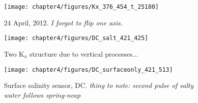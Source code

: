 \begin{figure}
	\texttt{[image: chapter4/figures/Kx\_376\_454\_t\_25180]} 
\caption{24 April, 2012. \emph{I forgot to flip one axis.}} \label{fig:Kx424}
\end{figure}



\begin{figure}
	\texttt{[image: chapter4/figures/DC\_salt\_421\_425]}
	\caption{Two K$_x$ structure due to vertical processes...} \label{fig:SDCApr2012}
\end{figure}


\begin{figure}
	\texttt{[image: chapter4/figures/DC\_surfaceonly\_421\_513]}
	\caption{Surface salinity sensor, DC. \emph{thing to note: second pulse of salty water follows spring-neap}} \label{fig:SsurfLT}
\end{figure}